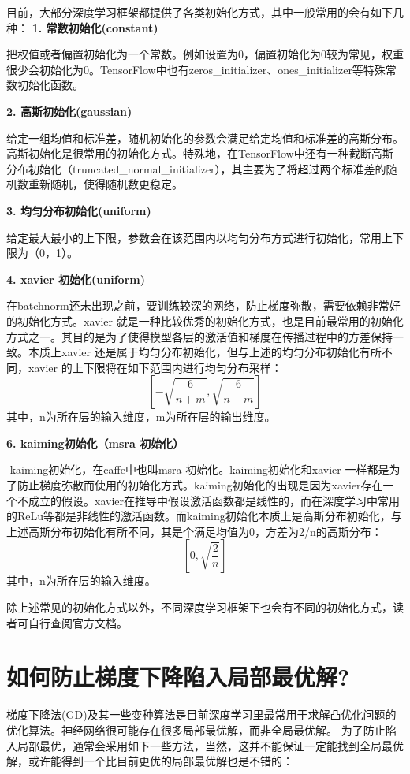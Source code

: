 目前，大部分深度学习框架都提供了各类初始化方式，其中一般常用的会有如下几种：
\textbf{1. 常数初始化(constant)}

​
把权值或者偏置初始化为一个常数。例如设置为0，偏置初始化为0较为常见，权重很少会初始化为0。TensorFlow中也有zeros\_initializer、ones\_initializer等特殊常数初始化函数。

\textbf{2. 高斯初始化(gaussian)}

​
给定一组均值和标准差，随机初始化的参数会满足给定均值和标准差的高斯分布。高斯初始化是很常用的初始化方式。特殊地，在TensorFlow中还有一种截断高斯分布初始化（truncated\_normal\_initializer），其主要为了将超过两个标准差的随机数重新随机，使得随机数更稳定。

\textbf{3. 均匀分布初始化(uniform)}

​
给定最大最小的上下限，参数会在该范围内以均匀分布方式进行初始化，常用上下限为（0，1）。

\textbf{4. xavier 初始化(uniform)}

​
在batchnorm还未出现之前，要训练较深的网络，防止梯度弥散，需要依赖非常好的初始化方式。xavier
就是一种比较优秀的初始化方式，也是目前最常用的初始化方式之一。其目的是为了使得模型各层的激活值和梯度在传播过程中的方差保持一致。本质上xavier
还是属于均匀分布初始化，但与上述的均匀分布初始化有所不同，xavier
的上下限将在如下范围内进行均匀分布采样： \[
[-\sqrt{\frac{6}{n+m}},\sqrt{\frac{6}{n+m}}]
\] ​ 其中，n为所在层的输入维度，m为所在层的输出维度。

\textbf{6. kaiming初始化（msra 初始化）}

​ kaiming初始化，在caffe中也叫msra 初始化。kaiming初始化和xavier
一样都是为了防止梯度弥散而使用的初始化方式。kaiming初始化的出现是因为xavier存在一个不成立的假设。xavier在推导中假设激活函数都是线性的，而在深度学习中常用的ReLu等都是非线性的激活函数。而kaiming初始化本质上是高斯分布初始化，与上述高斯分布初始化有所不同，其是个满足均值为0，方差为2/n的高斯分布：
\[
[0,\sqrt{\frac{2}{n}}]
\] ​ 其中，n为所在层的输入维度。

除上述常见的初始化方式以外，不同深度学习框架下也会有不同的初始化方式，读者可自行查阅官方文档。

\section{如何防止梯度下降陷入局部最优解?}\label{ux5982ux4f55ux9632ux6b62ux68afux5ea6ux4e0bux964dux9677ux5165ux5c40ux90e8ux6700ux4f18ux89e3}

梯度下降法(GD)及其一些变种算法是目前深度学习里最常用于求解凸优化问题的优化算法。神经网络很可能存在很多局部最优解，而非全局最优解。
为了防止陷入局部最优，通常会采用如下一些方法，当然，这并不能保证一定能找到全局最优解，或许能得到一个比目前更优的局部最优解也是不错的：

